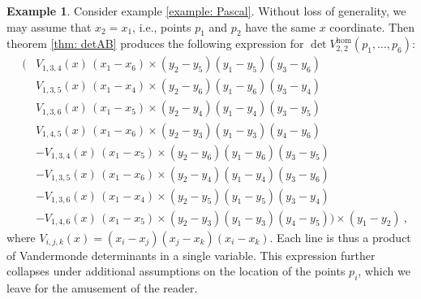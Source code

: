\documentclass[10pt]{amsart}
\theoremstyle{definition}
\newtheorem{example}[thm]{Example}
\theoremstyle{remark}
\numberwithin{equation}{section}
\newcommand{\0}{\color{blue}{\mathsf{0}}}
\begin{document}
\begin{example} \label{Ex: Pascalseparate}
Consider  example \ref{example: Pascal}.
Without loss of generality, we may assume that $x_2=x_1$, i.e., points $p_1$ and $p_2$ have the same $x$ coordinate. Then theorem \ref{thm: detAB} produces the  following expression for 
$
\det  V^{\mathrm{hom}}_{2,2}(p_1,\ldots, p_6)  $: 
\begin{eqnarray} 
& \Big( \!\!\!\!\!\!&  V_{1,3,4}(x)\, (x_1-x_6) \times (y_2-y_5)(y_1-y_5)(y_3-y_6)   \nonumber \\ 
&&  V_{1,3,5}(x)\,  (x_1-x_4) \times (y_2-y_6)(y_1-y_6)(y_3-y_4)\nonumber \\ 
&&  V_{1,3,6}(x) \,  (x_1-x_5) \times (y_2-y_4)(y_1-y_4)(y_3-y_5) \nonumber\\ 
  && V_{1,4,5}(x) \, (x_1-x_6) \times (y_2-y_3)(y_1-y_3)(y_4-y_6)  \nonumber\\
  && - V_{1,3,4}(x) \,   (x_1-x_5) \times (y_2-y_6)(y_1-y_6)(y_3-y_5) \nonumber\\ 
   && - V_{1,3,5}(x) \,    (x_1-x_6)\times (y_2-y_4)(y_1-y_4)(y_3-y_6) \nonumber\\
  &&  - V_{1,3,6}(x) \, (x_1-x_4) \times (y_2-y_5)(y_1-y_5)(y_3-y_4) \nonumber\\
  && -  V_{1,4,6}(x) \,   (x_1-x_5)\times (y_2-y_3)(y_1-y_3)(y_4-y_5)
   \Big) \times (y_1-y_2) \nonumber \ ,
    \end{eqnarray}
    where $V_{i,j,k}(x) = (x_i-x_j)(x_j-x_k)(x_i-x_k)$. 
    Each line is thus a  product of Vandermonde determinants in a single variable. 
    This expression further collapses under additional assumptions on the location of the points $p_i$, which we leave for the amusement of the reader.
   \end{example}
\end{document}
